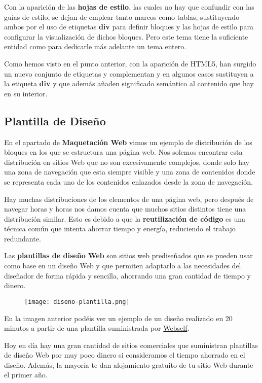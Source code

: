 Con la aparición de las \textbf{hojas de estilo}, las cuales no hay que confundir con las guías de estilo, se dejan de emplear tanto marcos como tablas, sustituyendo ambos por el uso de etiquetas \textbf{div} para definir bloques y las hojas de estilo para configurar la visualización de dichos bloques. Pero este tema tiene la suficiente entidad como para dedicarle más adelante un tema entero.

Como hemos visto en el punto anterior, con la aparición de HTML5, han surgido un nuevo conjunto de etiquetas y complementan y en algunos casos sustituyen a la etiqueta \textbf{div} y que además añaden significado semántico al contenido que hay en su interior.

\subsection{Plantilla de Diseño}
En el apartado de \textbf{Maquetación Web} vimos un ejemplo de distribución de los bloques en los que se estructura una página web. Nos solemos encontrar esta distribución en sitios Web que no son excesivamente complejos, donde solo hay una zona de navegación que esta siempre visible y una zona de contenidos donde se representa cada uno de los contenidos enlazados desde la zona de navegación.

Hay muchas distribuciones de los elementos de una página web, pero después de navegar horas y horas nos damos cuenta que muchos sitios distintos tiene una distribución similar. Esto es debido a que la \textbf{reutilización de código} es una técnica común que intenta ahorrar tiempo y energía, reduciendo el trabajo redundante.

Las \textbf{plantillas de diseño Web} son sitios web prediseñados que se pueden usar como base en un diseño Web y que permiten adaptarlo a las necesidades del diseñador de forma rápida y sencilla, ahorrando una gran cantidad de tiempo y dinero.

\begin{figure}[H]
    \centering
    \texttt{[image: diseno-plantilla.png]}
\end{figure}

En la imagen anterior podéis ver un ejemplo de un diseño realizado en 20 minutos a partir de una plantilla suministrada por \href{https://www.webself.net/}{Webself}.

Hoy en día hay una gran cantidad de sitios comerciales que suministran plantillas de diseño Web por muy poco dinero si consideramos el tiempo ahorrado en el diseño. Además, la mayoría te dan alojamiento gratuito de tu sitio Web durante el primer año.





